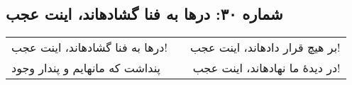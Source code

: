\begin{center}
\section*{شماره ۳۰: درها به فنا گشادهاند، اینت عجب}
\label{sec:030}
\begin{longtable}{l p{0.5cm} r}
درها به فنا گشادهاند، اینت عجب!
&&
بر هیچ قرار دادهاند، اینت عجب!
\\
پنداشت که مانهایم و پندار وجود
&&
در دیدهٔ ما نهادهاند، اینت عجب!
\\
\end{longtable}
\end{center}
